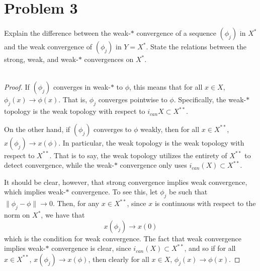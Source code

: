 \documentclass[fontsize=11pt]{scrartcl} %
\numberwithin{equation}{section} %
\numberwithin{figure}{section} %
\numberwithin{table}{section} %
\begin{document}
\section*{Problem 3}
Explain the difference between the weak-$*$ convergence of a sequence $(\phi_j)$ in
$X^*$ and the weak convergence of $(\phi_j)$ in $Y=X^*$. State the relations
between the strong, weak, and weak-$*$ convergences on $X^*$.
\\
\\
\begin{proof}
    If $(\phi_j)$ converges in weak-$*$ to $\phi$, this means that for all $x\in
    X$, $\phi_j(x) \to \phi(x)$. That is, $\phi_j$ converges pointwise to
    $\phi$. Specifically, the weak-$*$ topology is the weak topology with
    respect to $i_{can}X\subset X^{**}$.

    On the other hand, if $(\phi_j)$ converges to $\phi$ weakly, then for all
    $x\in X^{**}$, $x(\phi_j)\to x(\phi)$. In particular, the weak topology is
    the weak topology with respect to $X^{**}$. That is to say, the weak
    topology utilizes the entirety of $X^{**}$ to detect convergence, while the
    weak-$*$ convergence only uses $i_{can}(X)\subset X^{**}$.

    It should be clear, however, that strong convergence implies weak
    convergence, which implies weak-$*$ convergence. To see this, let $\phi_j$
    be such that $\|\phi_j-\phi\|\to 0$. Then, for any $x\in X^{**}$, since $x$
    is continuous with respect to the norm on $X^*$, we have that
    \[
        x(\phi_j)\to x(0)
    \]
    which is the condition for weak convergence. The fact that weak convergence
    implies weak-$*$ convergence is clear, since $i_{can}(X)\subset X^{**}$, and
    so if for all $x\in X^{**}$, $x(\phi_j)\to x(\phi)$, then clearly for all
    $x\in X$, $\phi_j(x)\to \phi(x)$.
\end{proof}
\end{document}
